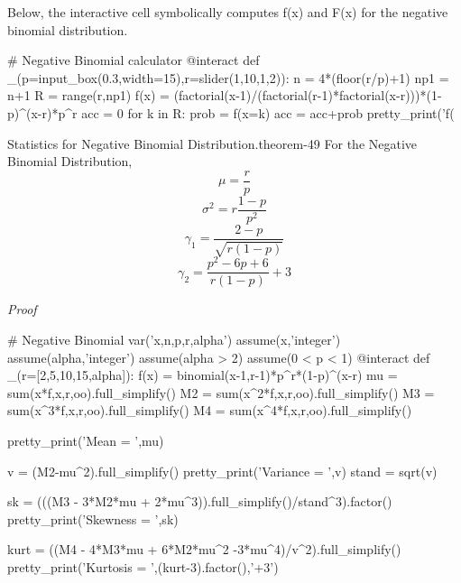 \documentclass[10pt,]{book}
\makeatletter
\renewcommand*{\proofname}{Proof}
\renewenvironment{proof}[1][\proofname]{\par
  \pushQED{\qed}%
  \normalfont \topsep6\p@\@plus6\p@\relax
  \trivlist
  \item\relax
    {\itshape
    #1\@addpunct{.}}\hspace\labelsep\ignorespaces
}{%
  \popQED\endtrivlist\@endpefalse
}
\numberwithin{equation}{section}
\makeatother
\begin{document}
%
\par
\hypertarget{p-913}{}%
Below, the interactive cell symbolically computes f(x) and F(x) for the negative binomial distribution.%
\par
\hypertarget{p-914}{}%
\leavevmode%
\begin{sageinput}
# Negative Binomial calculator
@interact
def _(p=input_box(0.3,width=15),r=slider(1,10,1,2)):
    n = 4*(floor(r/p)+1)
    np1 = n+1
    R = range(r,np1)
    f(x) = (factorial(x-1)/(factorial(r-1)*factorial(x-r)))*(1-p)^(x-r)*p^r
    acc = 0
    for k in R:
        prob = f(x=k)
        acc = acc+prob
        pretty_print('f(%
\end{sageinput}
%
\par
\hypertarget{p-915}{}%
\begin{theorem}{Statistics for Negative Binomial Distribution.}{}{theorem-49}%
\hypertarget{NegativeBinomialStatistics}{}%
For the Negative Binomial Distribution,%
\begin{equation*}
\mu = \frac{r}{p}
\end{equation*}
%
\begin{equation*}
\sigma^2 = r \frac{1-p}{p^2}
\end{equation*}
%
\begin{equation*}
\gamma_1 = \frac{2-p}{\sqrt{r(1-p)}}
\end{equation*}
%
\begin{equation*}
\gamma_2 = \frac{p^2-6p+6}{r(1-p)} + 3
\end{equation*}
%
\end{theorem}
\begin{proof}\hypertarget{proof-51}{}
\leavevmode%
\begin{sageinput}
# Negative Binomial
var('x,n,p,r,alpha')
assume(x,'integer')
assume(alpha,'integer')
assume(alpha > 2)
assume(0 < p < 1)
@interact
def _(r=[2,5,10,15,alpha]):
    f(x) = binomial(x-1,r-1)*p^r*(1-p)^(x-r)
    mu = sum(x*f,x,r,oo).full_simplify()
    M2 = sum(x^2*f,x,r,oo).full_simplify()
    M3 = sum(x^3*f,x,r,oo).full_simplify()
    M4 = sum(x^4*f,x,r,oo).full_simplify()
        
    pretty_print('Mean = ',mu)
    
    v = (M2-mu^2).full_simplify()
    pretty_print('Variance = ',v)
    stand = sqrt(v)
    
    sk = (((M3 - 3*M2*mu + 2*mu^3)).full_simplify()/stand^3).factor()
    pretty_print('Skewness = ',sk)
    
    kurt = ((M4 - 4*M3*mu + 6*M2*mu^2 -3*mu^4)/v^2).full_simplify()
    pretty_print('Kurtosis = ',(kurt-3).factor(),'+3')
\end{sageinput}
\end{proof}
\end{document}
